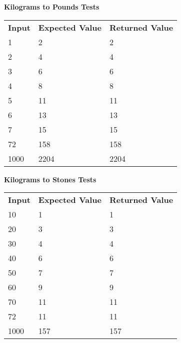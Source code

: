 \documentclass[a4paper]{article}
\begin{document}
\noindent \textbf{Kilograms to Pounds Tests}
\begin{table}[H]
\begin{tabular}{lll}
\textbf{Input} & \textbf{Expected Value} & \textbf{Returned Value} \\
1              & 2                       & 2                       \\
2              & 4                       & 4                       \\
3              & 6                       & 6                       \\
4              & 8                       & 8                       \\
5              & 11                      & 11                      \\
6              & 13                      & 13                      \\
7              & 15                      & 15                      \\
72             & 158                     & 158                     \\
1000           & 2204                    & 2204                   
\end{tabular}
\end{table}

\noindent \textbf{Kilograms to Stones Tests}
\begin{table}[H]
\begin{tabular}{lll}
\textbf{Input} & \textbf{Expected Value} & \textbf{Returned Value} \\
10             & 1                       & 1                       \\
20             & 3                       & 3                       \\
30             & 4                       & 4                       \\
40             & 6                       & 6                       \\
50             & 7                       & 7                       \\
60             & 9                       & 9                       \\
70             & 11                      & 11                      \\
72             & 11                      & 11                      \\
1000           & 157                     & 157                    
\end{tabular}
\end{table}
\end{document}

